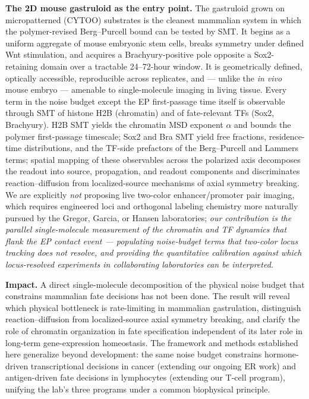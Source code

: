 \documentclass[11pt]{article}
\begin{document}
\textbf{The 2D mouse gastruloid as the entry point.} The gastruloid grown
on micropatterned (CYTOO) substrates is the cleanest mammalian system in
which the polymer-revised Berg--Purcell bound can be tested by SMT. It
begins as a uniform aggregate of mouse embryonic stem cells, breaks
symmetry under defined Wnt stimulation, and acquires a Brachyury-positive
pole opposite a Sox2-retaining domain over a tractable 24--72-hour
window. It is geometrically defined, optically accessible, reproducible
across replicates, and --- unlike the \textit{in vivo} mouse embryo ---
amenable to single-molecule imaging in living tissue. Every term in the
noise budget except the EP first-passage time itself is observable
through SMT of histone H2B (chromatin) and of fate-relevant TFs (Sox2,
Brachyury). H2B SMT yields the chromatin MSD exponent $\alpha$ and bounds
the polymer first-passage timescale; Sox2 and Bra SMT yield free
fractions, residence-time distributions, and the TF-side prefactors of
the Berg--Purcell and Lammers terms; spatial mapping of these observables
across the polarized axis decomposes the readout into source,
propagation, and readout components and discriminates reaction--diffusion
from localized-source mechanisms of axial symmetry breaking. We are
explicitly \emph{not} proposing live two-color enhancer/promoter pair
imaging, which requires engineered loci and orthogonal labeling chemistry
more naturally pursued by the Gregor, Garcia, or Hansen laboratories;
\textit{our contribution is the parallel single-molecule measurement of
the chromatin and TF dynamics that flank the EP contact event ---
populating noise-budget terms that two-color locus tracking does not
resolve, and providing the quantitative calibration against which
locus-resolved experiments in collaborating laboratories can be
interpreted.}

\textbf{Impact.} A direct single-molecule decomposition of the physical
noise budget that constrains mammalian fate decisions has not been done.
The result will reveal which physical bottleneck is rate-limiting in
mammalian gastrulation, distinguish reaction--diffusion from
localized-source axial symmetry breaking, and clarify the role of
chromatin organization in fate specification independent of its later
role in long-term gene-expression homeostasis. The framework and methods
established here generalize beyond development: the same noise budget
constrains hormone-driven transcriptional decisions in cancer (extending
our ongoing ER work) and antigen-driven fate decisions in lymphocytes
(extending our T-cell program), unifying the lab's three programs under
a common biophysical principle.
\end{document}
